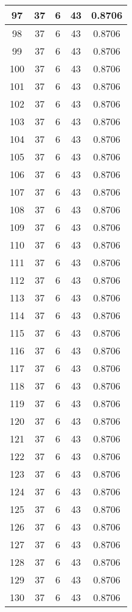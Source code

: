 \documentclass[letterpaper, 12pt]{article}
\begin{document}
\begin{longtable}{|c|c|c|c|c|}
\hline
97 & 37 & 6 & 43 & 0.8706 \\
\hline
98 & 37 & 6 & 43 & 0.8706 \\
\hline
99 & 37 & 6 & 43 & 0.8706 \\
\hline
100 & 37 & 6 & 43 & 0.8706 \\
\hline
101 & 37 & 6 & 43 & 0.8706 \\
\hline
102 & 37 & 6 & 43 & 0.8706 \\
\hline
103 & 37 & 6 & 43 & 0.8706 \\
\hline
104 & 37 & 6 & 43 & 0.8706 \\
\hline
105 & 37 & 6 & 43 & 0.8706 \\
\hline
106 & 37 & 6 & 43 & 0.8706 \\
\hline
107 & 37 & 6 & 43 & 0.8706 \\
\hline
108 & 37 & 6 & 43 & 0.8706 \\
\hline
109 & 37 & 6 & 43 & 0.8706 \\
\hline
110 & 37 & 6 & 43 & 0.8706 \\
\hline
111 & 37 & 6 & 43 & 0.8706 \\
\hline
112 & 37 & 6 & 43 & 0.8706 \\
\hline
113 & 37 & 6 & 43 & 0.8706 \\
\hline
114 & 37 & 6 & 43 & 0.8706 \\
\hline
115 & 37 & 6 & 43 & 0.8706 \\
\hline
116 & 37 & 6 & 43 & 0.8706 \\
\hline
117 & 37 & 6 & 43 & 0.8706 \\
\hline
118 & 37 & 6 & 43 & 0.8706 \\
\hline
119 & 37 & 6 & 43 & 0.8706 \\
\hline
120 & 37 & 6 & 43 & 0.8706 \\
\hline
121 & 37 & 6 & 43 & 0.8706 \\
\hline
122 & 37 & 6 & 43 & 0.8706 \\
\hline
123 & 37 & 6 & 43 & 0.8706 \\
\hline
124 & 37 & 6 & 43 & 0.8706 \\
\hline
125 & 37 & 6 & 43 & 0.8706 \\
\hline
126 & 37 & 6 & 43 & 0.8706 \\
\hline
127 & 37 & 6 & 43 & 0.8706 \\
\hline
128 & 37 & 6 & 43 & 0.8706 \\
\hline
129 & 37 & 6 & 43 & 0.8706 \\
\hline
130 & 37 & 6 & 43 & 0.8706 \\

\end{longtable}
\end{document}
